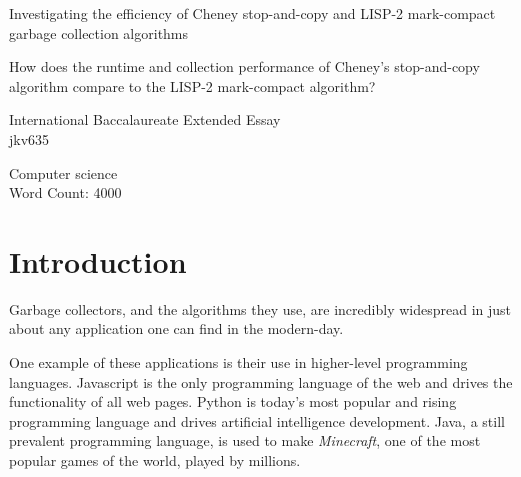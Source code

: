 \documentclass[index]{subfiles}
\begin{document}
\doublespacing{}
\begin{titlepage}
   \begin{center}
       \vspace*{1cm}

       {\huge{Investigating the efficiency of Cheney stop-and-copy and LISP-2 mark-compact garbage collection algorithms}}

       \vspace{1.5cm}

       How does the runtime and collection performance of Cheney's stop-and-copy algorithm compare to the LISP-2 mark-compact algorithm?
            
       \vspace{1.5cm}

       \vfill
            
       International Baccalaureate Extended Essay\\
       jkv635\\

       \vspace{0.8cm}
     
       Computer science\\
       \vspace{0.8cm}
       Word Count: 4000\\
            
   \end{center}
\end{titlepage}

\tableofcontents
\thispagestyle{empty}
\newpage
\setcounter{page}{1}

\section{Introduction}

Garbage collectors, and the algorithms they use, are incredibly widespread in just about any application one can find in the modern-day.

One example of these applications is their use in higher-level programming languages. Javascript is the only programming language of the web and drives the functionality of all web pages. Python is today's most popular and rising programming language and drives artificial intelligence development. Java, a still prevalent programming language, is used to make \textit{Minecraft}, one of the most popular games of the world, played by millions.
\end{document}
